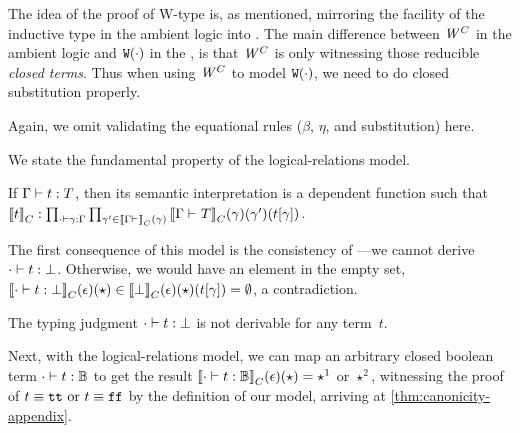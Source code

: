 The idea of the proof of W-type is, as mentioned, mirroring the facility of the inductive type in the ambient logic into \TT. The main difference between $\mathit{W}^C$ in the ambient logic and $\texttt{W}({\cdot})$ in the \TT, is that $\mathit{W}^C$ is only witnessing those reducible \emph{closed terms}. Thus when using $\mathit{W}^C$ to model $\texttt{W}({\cdot})$, we need to do closed substitution properly. 

Again, we omit validating the equational rules ($\beta$, $\eta$, and substitution) here.

We state the fundamental property of the logical-relations model.
\begin{theorem}
  If\/ $ {\Gamma} \vdash {t} : {T} $, then its semantic interpretation is a dependent function such that
  ${\llbracket {t} \rrbracket}_C : \prod_{ {\cdot} \vdash {\ensuremath{\gamma}} : {\Gamma} } \prod_{\gamma' \in {\llbracket {\ensuremath{ {\Gamma} \vdash_{} }} \rrbracket}_C(\gamma)}{\llbracket {\ensuremath{ {\Gamma} \vdash_{} {T} }} \rrbracket}_C(\gamma)(\gamma')({t}\!\left[{\gamma}\right])$.
\end{theorem}

The first consequence of this model is the consistency of \TT---we cannot derive
$ {\cdot} \vdash {t} : {\bot} $. Otherwise, we would have an element in the empty set,
${\llbracket {\ensuremath{ {\cdot} \vdash {t} : {\bot} }} \rrbracket}_C(\epsilon)(\star) \in
{\llbracket {\bot} \rrbracket}_C(\epsilon)(\star)({t}\!\left[{\gamma}\right]) = \emptyset$, a contradiction.

\begin{theorem}[Consistency]
  The typing judgment $ {\cdot} \vdash {t} : {\bot} $ is not derivable for any term~$t$.
\end{theorem}

Next, with the logical-relations model, we can map an arbitrary closed boolean
term $ {\cdot} \vdash {t} : {\mathbb{B}} $ to get the result
${\llbracket {\ensuremath{ {\cdot} \vdash {t} : {\mathbb{B}} }} \rrbracket}_C(\epsilon)(\star) = \star^1$ or $\star^2$,
witnessing the proof of $t \equiv \texttt{tt} \text{ or } t \equiv\texttt{ff}$ by the definition of our model, arriving at
\cref{thm:canonicity-appendix}.


